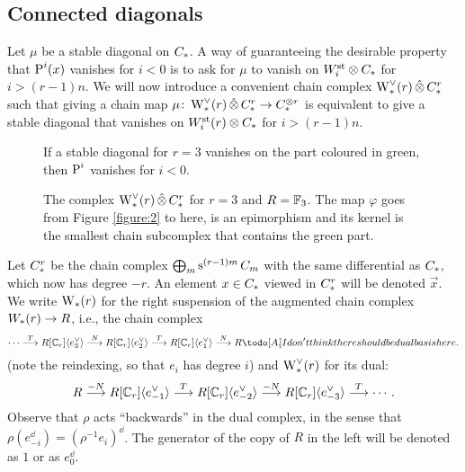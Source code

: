 \subsection{Connected diagonals}\label{s:connected}

Let $\mu$ be a stable diagonal on $\ucadenas$.
A way of guaranteeing the desirable property that $\power^i(x)$ vanishes for $i<0$ is to ask for $\mu$ to vanish on $\Wst[i] \ot \ucadenas$ for $i>(r-1)n$.
We will now introduce a convenient chain complex $\rWd(r) \hotimes \rucadenas$ such that giving a chain map $\mu \colon \rWd(r)  \hotimes \rucadenas \to \ucadenas^{\ot r}$ is equivalent to give a stable diagonal that vanishes on $\Wst[i](r) \ot \ucadenas$ for $i>(r-1)n$.

\begin{figure}
	
	\caption{If a stable diagonal for $r=3$ vanishes on the part coloured in green, then $\power^i$ vanishes for $i<0$.}
	\label{figure:2}

	
	\caption{The complex $\rWd(r) \hotimes \rucadenas$ for $r=3$ and $R=\bF_3$.
		The map $\varphi$ goes from Figure \ref{figure:2} to here, is an epimorphism and its kernel is the smallest chain subcomplex that contains the green part.}
	\label{figure:3}
\end{figure}

Let $\rucadenas$ be the chain complex $\bigoplus_m \sus{(r-1)m}\ucadenas[m]$ with the same differential as $\ucadenas$, which now has degree $-r$.
An element $x\in \ucadenas$ viewed in $\rucadenas$ will be denoted $\vec{x}$.
We write $\rW(r)$ for the right suspension of the augmented chain complex $\W(r) \to R$, i.e., the chain complex
\[
\dotsb
\overset{T}{\lra}
R[\Cyc_r]\langle e_{3}^\dd\rangle
\overset{N}{\lra}
R[\Cyc_r]\langle e_{2}^\dd\rangle
\overset{T}{\lra}
R[\Cyc_r]\langle e_{1}^\dd\rangle
\overset{N}{\lra}
R\anibal{I don't think there should be dual basis here.}
\]
(note the reindexing, so that $e_i$ has degree $i$) and $\rWd(r)$ for its dual:
\[
R\overset{-N}{\lra} R[\Cyc_r]\langle e_{-1}^\dd\rangle \overset{T}{\lra} R[\Cyc_r]\langle e_{-2}^\dd\rangle \overset{-N}{\lra} R[\Cyc_r]\langle e_{-3}^\dd\rangle \overset{T}{\lra} \dotsb.
\]
Observe that $\rho$ acts ``backwards'' in the dual complex, in the sense that $\rho (e_{-i}^\dd) = (\rho^{-1} e_i)^{\dd}$.
The generator of the copy of $R$ in the left will be denoted as $1$ or as $e_0^\dd$.

